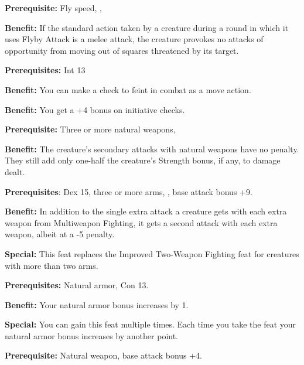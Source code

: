 \textbf{Prerequisite:} Fly speed, , 

\textbf{Benefit:} If the standard action taken by a creature during a round in which it uses Flyby Attack is a melee attack, the creature provokes no attacks of opportunity from moving out of squares threatened by its target.


\textbf{Prerequisites:} Int 13

\textbf{Benefit:} You can make a  check to feint in combat as a move action.


\textbf{Benefit:} You get a +4 bonus on initiative checks.


\textbf{Prerequisite:} Three or more natural weapons, 

\textbf{Benefit:} The creature's secondary attacks with natural weapons have no penalty. They still add only one-half the creature's Strength bonus, if any, to damage dealt.


\textbf{Prerequisites}: Dex 15, three or more arms, , base 
attack bonus +9.

\textbf{Benefit:} In addition to the single extra attack a creature gets with each extra weapon from Multiweapon Fighting, it gets a second attack with each extra weapon, albeit at a -5 penalty.

\textbf{Special:} This feat replaces the Improved Two-Weapon Fighting feat for creatures with more than two arms.


\textbf{Prerequisites:} Natural armor, Con 13.

\textbf{Benefit:} Your natural armor bonus increases by 1.

\textbf{Special:} You can gain this feat multiple times. Each time you take the feat your natural armor bonus increases by another point.


\textbf{Prerequisite:} Natural weapon, base attack bonus +4.

